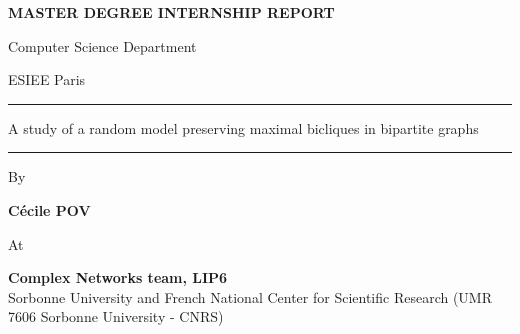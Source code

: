 \documentclass[table]{report}
\begin{document}
{\large

\vspace*{1cm}

\begin{center}

{\bf MASTER DEGREE INTERNSHIP REPORT}

\vspace*{0.4cm}

Computer Science Department 

\vspace*{0.1cm}

ESIEE Paris

\vspace*{1cm}

\rule{\linewidth}{0.5pt}
{\Large {\sc A study of a random model preserving maximal bicliques in bipartite graphs}}
\rule{\linewidth}{1pt}

\vspace*{0.5cm}
By\ \\


\vspace*{0.5cm}


{\Large {\bf Cécile POV}}

\vspace*{1cm}


At

\vspace*{0.5cm}

{\Large {\bf Complex Networks team, LIP6} \\
Sorbonne University and French National Center for Scientific Research (UMR 7606 Sorbonne University - CNRS)}




\vspace*{1cm}

\end{center}

%  

\vspace*{1.5cm} 
\\[2ex]
\\[1ex]


}
\end{document}
